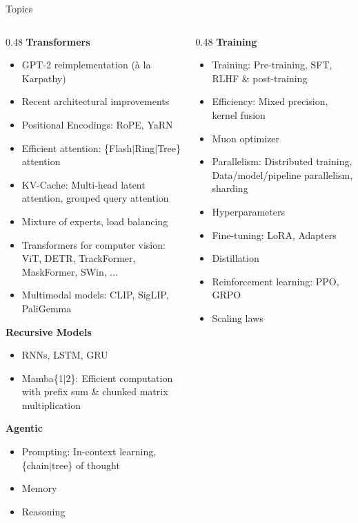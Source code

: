 \begin{frame}{Topics}
  \small
  \begin{columns}
    \begin{column}{0.48\textwidth}
      \textbf{Transformers}
      \begin{itemize}
        \item GPT-2 reimplementation ({\`a} la Karpathy)
	\item Recent architectural improvements
	\item Positional Encodings: RoPE, YaRN
	\item Efficient attention: \{Flash$|$Ring$|$Tree\} attention
	\item KV-Cache: Multi-head latent attention, grouped query attention
	\item Mixture of experts, load balancing
	\item Transformers for computer vision: ViT, DETR, TrackFormer, MaskFormer, SWin, $\ldots$
	\item Multimodal models: CLIP, SigLIP, PaliGemma
      \end{itemize}

      \textbf{Recursive Models}
      \begin{itemize}
	      \item RNNs, LSTM, GRU
	      \item Mamba\{1$|$2\}: Efficient computation with prefix sum \& chunked matrix multiplication
      \end{itemize}

      \textbf{Agentic}
      \begin{itemize}
	      \item Prompting: In-context learning, \{chain$|$tree\} of thought
	      \item Memory
	      \item Reasoning
      \end{itemize}

    \end{column}

    \begin{column}{0.48\textwidth}
      \textbf{Training}
      \begin{itemize}
	      \item Training: Pre-training, SFT, RLHF \& post-training
	      \item Efficiency: Mixed precision, kernel fusion 
	      \item Muon optimizer
	      \item Parallelism: Distributed training, Data/model/pipeline parallelism, sharding
          \item Hyperparameters
	      \item Fine-tuning: LoRA, Adapters
	      \item Distillation
	      \item Reinforcement learning: PPO, GRPO
	      \item Scaling laws
      \end{itemize}



\end{column}
\end{columns}
\end{frame}
